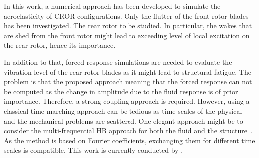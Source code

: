 In this work, a numerical approach has been developed to
simulate the aeroelasticity of CROR configurations. Only the flutter of the
front rotor blades has been investigated. The rear rotor
 to be studied. In particular, the wakes that are
shed from the front rotor might lead to exceeding level of
local excitation on the rear rotor, hence its importance.

In addition to that, forced
response simulations are needed to evaluate the vibration
level of the rear rotor blades as it might lead
to structural fatigue.
The problem is that the
proposed approach  meaning
that the forced response can not be computed as the
change in amplitude due to the fluid response is of
prior importance. Therefore, a strong-coupling approach
is required. However, using a classical time-marching approach
can be tedious as time scales of the physical 
and the mechanical problems are scattered. One elegant approach might
be to consider the multi-frequential HB approach for both the
fluid and the structure~\cite{Salles2011}. 
As the method is based on Fourier coefficients,
exchanging them for different time scales is compatible.
This work is currently conducted by \citet{ThesisCadel}.

